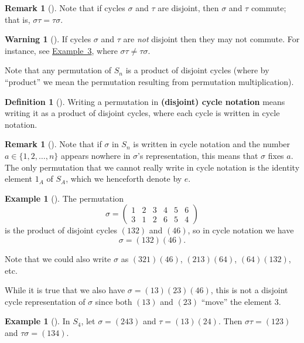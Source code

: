 \documentclass[10pt,openany,oneside]{book}
\newcommand{\terminology}[1]{\textbf{#1}}
\theoremstyle{plain}
\theoremstyle{definition}
\newtheorem{definition}[theorem]{Definition}
\theoremstyle{definition}
\newtheorem{remark}[theorem]{Remark}
\newtheorem{warning}[theorem]{Warning}
\theoremstyle{definition}
\newtheorem{example}[theorem]{Example}
\theoremstyle{definition}
\numberwithin{equation}{section}
\newcommand{\amp}{&}
\begin{document}
\begin{remark}[]\label{remark-28}
Note that if cycles \(\sigma\) and \(\tau\) are disjoint, then \(\sigma\) and \(\tau\) commute; that is, \(\sigma \tau=\tau \sigma\).%
\end{remark}
\begin{warning}[]\label{warning-17}
If cycles \(\sigma\) and \(\tau\) are \emph{not} disjoint then they may not commute. For instance, see \hyperref[nocommute]{Example~3}, where \(\sigma\tau \neq \tau \sigma\).%
\end{warning}
Note that any permutation of \(S_n\) is a product of disjoint cycles (where by ``product'' we mean the permutation resulting from permutation multiplication).%
\begin{definition}[{}]\label{definition-48}
Writing a permutation in \terminology{(disjoint) cycle notation} means writing it as a product of disjoint cycles, where each cycle is written in cycle notation.%
\end{definition}
\begin{remark}[]\label{remark-29}
Note that if \(\sigma\) in \(S_n\) is written in cycle notation and the number \(a\in \{1,2,\ldots, n\}\) appears nowhere in \(\sigma\)'s representation, this means that \(\sigma\) fixes \(a\). The only permutation that we cannot really write in cycle notation is the identity element \(1_A\) of \(S_A\), which we henceforth denote by \(e\).%
\end{remark}
\begin{example}[]\label{example-52}
The permutation%
\begin{equation*}
\sigma =\begin{pmatrix}1\amp 2\amp 3\amp 4\amp 5\amp 6\\ 3\amp 1\amp 2\amp 6\amp 5\amp 4
\end{pmatrix}
\end{equation*}
is the product of disjoint cycles \((132)\) and \((46)\), so in cycle notation we have%
\begin{equation*}
\sigma=(132)(46).
\end{equation*}
%
\par
Note that we could also write \(\sigma\) as \((321)(46)\), \((213)(64)\), \((64)(132)\), etc.%
\par
While it is true that we also have \(\sigma=(13)(23)(46)\), this is not a disjoint cycle representation of \(\sigma\) since both \((13)\) and \((23)\) ``move'' the element \(3\).%
\end{example}
\begin{example}[]\label{example-53}
In \(S_4\), let \(\sigma=(243)\) and \(\tau=(13)(24)\). Then \(\sigma \tau=(123)\) and \(\tau \sigma = (134).\)%
\end{example}
\end{document}
